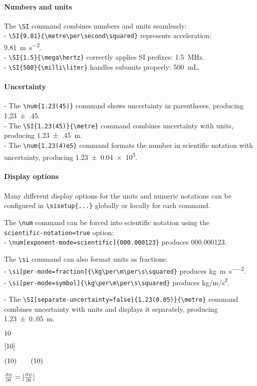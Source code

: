 	\paragraph*{Numbers and units}
	The \verb|\SI| command combines numbers and units seamlessly:  \\
	- \verb|\SI{9.81}{\metre\per\second\squared}| represents acceleration:\\ \SI{9.81}{\metre\per\second\squared}.  \\
	- \verb|\SI{1.5}{\mega\hertz}| correctly applies SI prefixes: \SI{1.5}{\mega\hertz}.  \\
	- \verb|\SI{500}{\milli\liter}| handles subunits properly: \SI{500}{\milli\liter}.
	
	\paragraph*{Uncertainty}
	- The \verb|\num{1.23(45)}| command shows uncertainty in parentheses, producing \num{1.23(45)}. \\
	- The \verb|\SI{1.23(45)}{\metre}| command combines uncertainty with units, producing \SI{1.23(45)}{\metre}.  \\
	- The \verb|\num{1.23(4)e5}| command formats the number in scientific notation with uncertainty, producing \num{1.23(4)e5}.  
	
	\paragraph*{Display options}
	Many different display options for the units and numeric notations can be configured in \verb|\sisetup{...}| globally or locally for each command.
	
	The \verb|\num| command can be forced into scientific notation using the \\ 
	\verb|scientific-notation=true| option:\\  
	- \verb|\num[exponent-mode=scientific]{000.000123}| produces \num[exponent-mode=scientific]{000.000123}.  
	
	The \verb|\si| command can also format units as fractions:  \\
	- \verb|\si[per-mode=fraction]{\kg\per\m\per\s\squared}| produces \si[per-mode=fraction]{\kg\per\m\per\s\squared}.\\
	- \verb|\si[per-mode=symbol]{\kg\per\m\per\s\squared}| produces \si[per-mode=symbol]{\kg\per\m\per\s\squared}.  
	
	- The \verb|\SI[separate-uncertainty=false]{1.23(0.05)}{\metre}| command combines uncertainty with units and displays it separately, producing \SI[separate-uncertainty=false]{1.23(0.05)}{\metre}.  
	
	
	
	
	
	
	
$\set{10}$

$\set[10]$

$\set(10) \qquad \qty(10)$

$\pdv{\psi}{t} = \set[ \frac{\partial \psi}{\partial t} ]$
